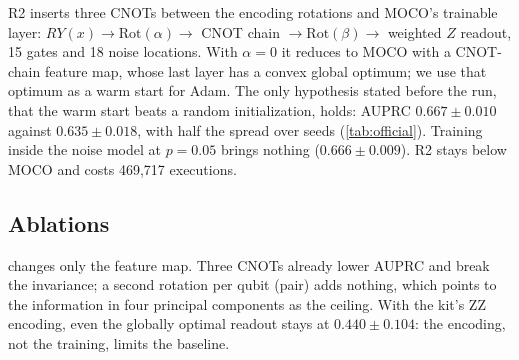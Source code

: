\documentclass[10pt,twocolumn]{article}
\theoremstyle{definition}
\begin{document}
R2 inserts three CNOTs between the encoding rotations and MOCO's trainable layer:
$RY(x)\to\mathrm{Rot}(\alpha)\to$ CNOT chain $\to\mathrm{Rot}(\beta)\to$ weighted $Z$ readout, 15 gates and 18
noise locations. With $\alpha=0$ it reduces to MOCO with a CNOT-chain feature map, whose last layer has a convex
global optimum; we use that optimum as a warm start for Adam. The only hypothesis stated before the run, that the
warm start beats a random initialization, holds: AUPRC $0.667\pm0.010$ against $0.635\pm0.018$, with half the
spread over seeds (\cref{tab:official}). Training inside the noise model at $p=0.05$ brings nothing
($0.666\pm0.009$). R2 stays below MOCO and costs 469,717 executions.

\subsection{Ablations}

\begin{table}[t]
\centering\small
\caption{Feature-map ablations with the same convex training (test AUPRC, 5 seeds).}
\label{tab:ablation}
\setlength{\tabcolsep}{3pt}
\end{table}

 changes only the feature map. Three CNOTs already lower AUPRC and break the invariance; a
second rotation per qubit (pair) adds nothing, which points to the information in four principal components as
the ceiling. With the kit's ZZ encoding, even the globally optimal readout stays at $0.440\pm0.104$: the encoding,
not the training, limits the baseline.
\end{document}
